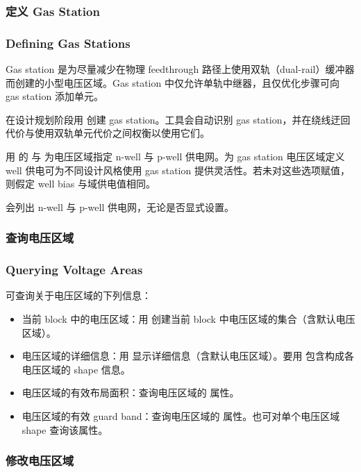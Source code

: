 \subsubsection{定义 Gas Station}
\subsubsection*{Defining Gas Stations}

Gas station 是为尽量减少在物理 feedthrough 路径上使用双轨（dual-rail）缓冲器而创建的小型电压区域。Gas station 中仅允许单轨中继器，且仅优化步骤可向 gas station 添加单元。

在设计规划阶段用  创建 gas station。工具会自动识别 gas station，并在绕线迂回代价与使用双轨单元代价之间权衡以使用它们。

用  的  与  为电压区域指定 n-well 与 p-well 供电网。为 gas station 电压区域定义 well 供电可为不同设计风格使用 gas station 提供灵活性。若未对这些选项赋值，则假定 well bias 与域供电值相同。

 会列出 n-well 与 p-well 供电网，无论是否显式设置。

\subsubsection{查询电压区域}
\subsubsection*{Querying Voltage Areas}

可查询关于电压区域的下列信息：
\begin{itemize}
  \item 当前 block 中的电压区域：用  创建当前 block 中电压区域的集合（含默认电压区域）。
  \item 电压区域的详细信息：用  显示详细信息（含默认电压区域）。要用  包含构成各电压区域的 shape 信息。
  \item 电压区域的有效布局面积：查询电压区域的  属性。
  \item 电压区域的有效 guard band：查询电压区域的  属性。也可对单个电压区域 shape 查询该属性。
\end{itemize}

\subsubsection{修改电压区域}
